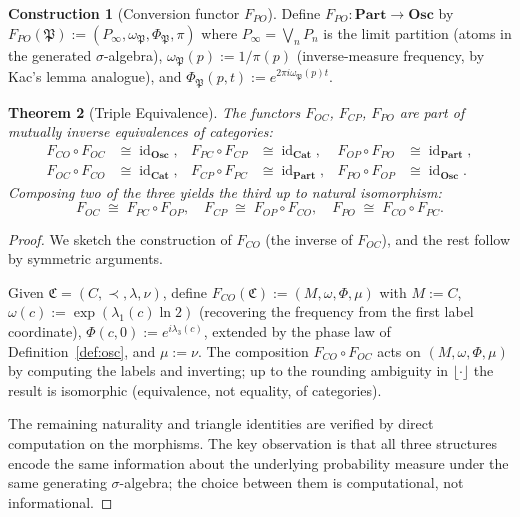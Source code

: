 \documentclass[11pt,a4paper]{article}
\theoremstyle{thmstyle}
\newtheorem{theorem}{Theorem}[section]
\theoremstyle{thmstyle}
\theoremstyle{definition}
\newtheorem{construction}[theorem]{Construction}
\theoremstyle{remark}
\DeclareMathOperator{\id}{id}
\newcommand{\Cat}{\mathfrak{C}}
\newcommand{\Part}{\mathfrak{P}}
\newcommand{\Cat}{\mathfrak{C}}
\begin{document}
\begin{construction}[Conversion functor $F_{PO}$]\label{constr:F-PO}
Define $F_{PO} : \mathbf{Part} \to \mathbf{Osc}$ by
$F_{PO}(\Part) := (P_{\infty}, \omega_{\Part},
\Phi_{\Part}, \pi)$ where $P_{\infty} = \bigvee_{n}
P_{n}$ is the limit partition (atoms in the generated
$\sigma$-algebra), $\omega_{\Part}(p) := 1/\pi(p)$
(inverse-measure frequency, by Kac's lemma analogue),
and $\Phi_{\Part}(p, t) := e^{2\pi i \omega_{\Part}(p) t}$.
\end{construction}

\begin{theorem}[Triple Equivalence]\label{thm:triple-equiv}
The functors $F_{OC}$, $F_{CP}$, $F_{PO}$ are part of
mutually inverse equivalences of categories:
\begin{align}
F_{CO} \circ F_{OC} &\cong \id_{\mathbf{Osc}}, &
F_{PC} \circ F_{CP} &\cong \id_{\mathbf{Cat}}, &
F_{OP} \circ F_{PO} &\cong \id_{\mathbf{Part}}, \\
F_{OC} \circ F_{CO} &\cong \id_{\mathbf{Cat}}, &
F_{CP} \circ F_{PC} &\cong \id_{\mathbf{Part}}, &
F_{PO} \circ F_{OP} &\cong \id_{\mathbf{Osc}}.
\end{align}
Composing two of the three yields the third up to
natural isomorphism:
\[
F_{OC} \;\cong\; F_{PC} \circ F_{OP},\quad
F_{CP} \;\cong\; F_{OP} \circ F_{CO},\quad
F_{PO} \;\cong\; F_{CO} \circ F_{PC}.
\]
\end{theorem}

\begin{proof}
We sketch the construction of $F_{CO}$ (the inverse of
$F_{OC}$), and the rest follow by symmetric arguments.

Given $\Cat = (C, \prec, \lambda, \nu)$, define
$F_{CO}(\Cat) := (M, \omega, \Phi, \mu)$ with $M := C$,
$\omega(c) := \exp(\lambda_{1}(c) \ln 2)$ (recovering
the frequency from the first label coordinate),
$\Phi(c, 0) := e^{i \lambda_{3}(c)}$, extended by the
phase law of Definition~\ref{def:osc}, and $\mu := \nu$.
The composition $F_{CO} \circ F_{OC}$ acts on
$(M, \omega, \Phi, \mu)$ by computing the labels and
inverting; up to the rounding ambiguity in
$\lfloor \cdot \rfloor$ the result is isomorphic
(equivalence, not equality, of categories).

The remaining naturality and triangle identities are
verified by direct computation on the morphisms.  The
key observation is that all three structures encode the
same information about the underlying probability
measure under the same generating $\sigma$-algebra; the
choice between them is computational, not informational.
\end{proof}
\end{document}
